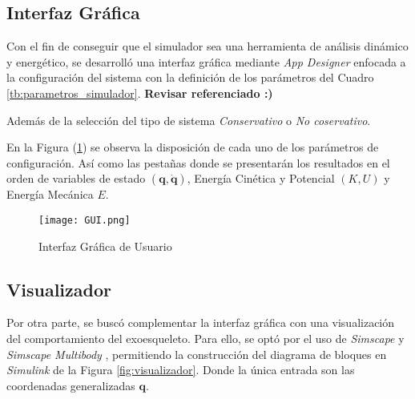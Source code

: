 \subsection{Interfaz Gráfica}
    Con el fin de conseguir que el simulador sea una herramienta de análisis dinámico y energético,
    se desarrolló una interfaz gráfica mediante \emph{App Designer} \cite{app_designer} enfocada a
    la configuración del sistema con la definición de los parámetros
    del Cuadro \ref{tb:parametros_simulador}. \textbf{Revisar referenciado :)}
    
    Además de la selección del tipo de sistema \emph{Conservativo} o \emph{No coservativo}. 
    \begin{table}[H]%
        \label{tb:parametros_simulador}
        \centering
        \begin{center}
        \caption{Parámetros de configuración del simulador} 
        \centering
        \bigskip
        \end{center}
    \end{table}
    En la Figura (\ref{fig:GUI}) se observa la disposición de cada uno de los parámetros de configuración. Así
    como las pestañas donde se presentarán los resultados en el orden de variables de estado $(\boldsymbol{q}, \boldsymbol{\dot{q}})$,
    Energía Cinética y Potencial $(K, U)$ y Energía Mecánica $E$. 
    \begin{figure}[H]
        \texttt{[image: GUI.png]}
        \centering
        \caption{ Interfaz Gráfica de Usuario }
        \label{fig:GUI}
    \end{figure}

\subsection{Visualizador}
    Por otra parte, se buscó complementar la interfaz gráfica con una visualización del comportamiento
    del exoesqueleto. Para ello, se optó por el uso de \emph{Simscape} \cite{simscape} y \emph{Simscape Multibody} \cite{SimscapeMultibody}, 
    permitiendo la construcción del diagrama de bloques en \emph{Simulink} de la Figura \ref{fig:visualizador}.
    Donde la única entrada son las coordenadas generalizadas $\boldsymbol{q}$.


